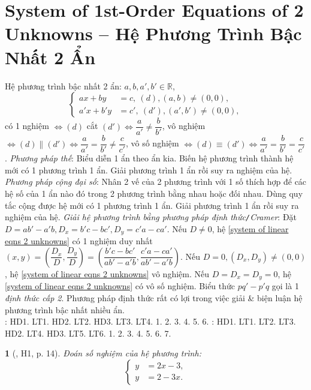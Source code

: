 \documentclass{article}
\newtheorem{baitoan}{}
\begin{document}
\section{System of 1st-Order Equations of 2 Unknowns -- Hệ Phương Trình Bậc Nhất 2 Ẩn}
 Hệ phương trình bậc nhất 2 ẩn: $a,b,a',b'\in\mathbb{R}$,
\begin{equation}
	\label{system of linear eqns 2 unknowns}
	\left\{\begin{split}
		ax + by &= c,\ (d),(a,b)\ne(0,0),\\
		a'x + b'y &= c',\ (d'),(a',b')\ne(0,0),
	\end{split}\right.
\end{equation}
có 1 nghiệm $\Leftrightarrow(d)$ cắt $(d')\Leftrightarrow\dfrac{a}{a'}\ne\dfrac{b}{b'}$, vô nghiệm $\Leftrightarrow(d)\parallel(d')\Leftrightarrow\dfrac{a}{a'} = \dfrac{b}{b'}\ne\dfrac{c}{c'}$, vô số nghiệm $\Leftrightarrow(d)\equiv(d')\Leftrightarrow\dfrac{a}{a'} = \dfrac{b}{b'} = \dfrac{c}{c'}$.  \textit{Phương pháp thế}: Biểu diễn 1 ẩn theo ẩn kia. Biến hệ phương trình thành hệ mới có 1 phương trình 1 ẩn. Giải phương trình 1 ẩn rồi suy ra nghiệm của hệ.  \textit{Phương pháp cộng đại số}: Nhân 2 vế của 2 phương trình với 1 số thích hợp để các hệ số của 1 ẩn nào đó trong 2 phương trình bằng nhau hoặc đối nhau. Dùng quy tắc cộng được hệ mới có 1 phương trình 1 ẩn. Giải phương trình 1 ẩn rồi suy ra nghiệm của hệ.  \textit{Giải hệ phương trình bằng phương pháp định thức{\tt/}Cramer}: Đặt $D = ab' - a'b,D_x = b'c - bc',D_y = c'a - ca'$. Nếu $D\ne0$, hệ \eqref{system of linear eqns 2 unknowns} có 1 nghiệm duy nhất $(x,y) = \left(\dfrac{D_x}{D},\dfrac{D_y}{D}\right) = \left(\dfrac{b'c - bc'}{ab' - a'b},\dfrac{c'a - ca'}{ab' - a'b}\right)$. Nếu $D = 0,(D_x,D_y)\ne(0,0)$, hệ \eqref{system of linear eqns 2 unknowns} vô nghiệm. Nếu $D = D_x = D_y = 0$, hệ \eqref{system of linear eqns 2 unknowns} có vô số nghiệm. Biểu thức $pq' - p'q$ gọi là 1 \textit{định thức cấp 2}. Phương pháp định thức rất có lợi trong việc giải \& biện luận hệ phương trình bậc nhất nhiều ẩn.\\

\noindent\cite[\S2, pp. 12--18]{SGK_Toan_9_Canh_Dieu_tap_1}: HD1. LT1. HD2. LT2. HD3. LT3. LT4. 1. 2. 3. 4. 5. 6. \cite[\S3, pp. 19--25]{SGK_Toan_9_Canh_Dieu_tap_1}: HD1. LT1. LT2. LT3. HD2. LT4. HD3. LT5. LT6. 1. 2. 3. 4. 5. 6. 7.

\begin{baitoan}[\cite{Binh_boi_duong_Toan_9_tap_2}, H1, p. 14]
	Đoán số nghiệm của hệ phương trình:
	\begin{equation*}
		\left\{\begin{split}
			y &= 2x - 3,\\
			y &= 2 - 3x.
		\end{split}\right.
	\end{equation*}
\end{baitoan}
\end{document}
